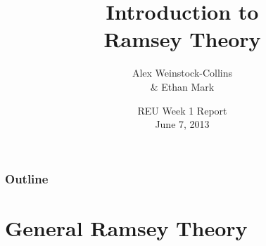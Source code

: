 \documentclass[pdf,hyperref={urlbordercolor={0 1 1}},xcolor=pdftex,dvipsnames]{beamer}
\title[Introduction to Ramsey Theory]
{Introduction to \\Ramsey Theory}
\author[Alex Weinstock-Collins \& Ethan Mark]
  {{Alex Weinstock-Collins\\\vspace{.1cm} \& Ethan Mark}\\
}
\date{
  REU Week 1 Report\\ \vspace{.25cm}
  June 7, 2013
}
\begin{document}
\begin{frame}
  \titlepage
\end{frame}

\begin{frame}
  \frametitle{Outline}
  \tableofcontents
\end{frame}


\section{General Ramsey Theory}
\end{document}
